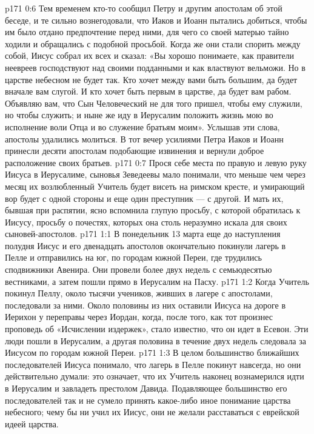 \vs p171 0:6 Тем временем кто\hyp{}то сообщил Петру и другим апостолам об этой беседе, и те сильно вознегодовали, что Иаков и Иоанн пытались добиться, чтобы им было отдано предпочтение перед ними, для чего со своей матерью тайно ходили и обращались с подобной просьбой. Когда же они стали спорить между собой, Иисус собрал их всех и сказал: «Вы хорошо понимаете, как правители неевреев господствуют над своими подданными и как властвуют вельможи. Но в царстве небесном не будет так. Кто хочет между вами быть большим, да будет вначале вам слугой. И кто хочет быть первым в царстве, да будет вам рабом. Объявляю вам, что Сын Человеческий не для того пришел, чтобы ему служили, но чтобы служить; и ныне же иду в Иерусалим положить жизнь мою во исполнение воли Отца и во служение братьям моим». Услышав эти слова, апостолы удалились молиться. В тот вечер усилиями Петра Иаков и Иоанн принесли десяти апостолам подобающие извинения и вернули доброе расположение своих братьев.
\vs p171 0:7 Прося себе места по правую и левую руку Иисуса в Иерусалиме, сыновья Зеведеевы мало понимали, что меньше чем через месяц их возлюбленный Учитель будет висеть на римском кресте, и умирающий вор будет с одной стороны и еще один преступник --- с другой. И мать их, бывшая при распятии, ясно вспомнила глупую просьбу, с которой обратилась к Иисусу, просьбу о почестях, которых она столь неразумно искала для своих сыновей\hyp{}апостолов.
\vs p171 1:1 В понедельник 13 марта еще до наступления полудня Иисус и его двенадцать апостолов окончательно покинули лагерь в Пелле и отправились на юг, по городам южной Переи, где трудились сподвижники Авенира. Они провели более двух недель с семьюдесятью вестниками, а затем пошли прямо в Иерусалим на Пасху.
\vs p171 1:2 Когда Учитель покинул Пеллу, около тысячи учеников, живших в лагере с апостолами, последовали за ними. Около половины из них оставили Иисуса на дороге в Иерихон у переправы через Иордан, когда, после того, как тот произнес проповедь об «Исчислении издержек», стало известно, что он идет в Есевон. Эти люди пошли в Иерусалим, а другая половина в течение двух недель следовала за Иисусом по городам южной Переи.
\vs p171 1:3 В целом большинство ближайших последователей Иисуса понимало, что лагерь в Пелле покинут навсегда, но они действительно думали: это означает, что их Учитель наконец вознамерился идти в Иерусалим и завладеть престолом Давида. Подавляющее большинство его последователей так и не сумело принять какое\hyp{}либо иное понимание царства небесного; чему бы ни учил их Иисус, они не желали расставаться с еврейской идеей царства.
